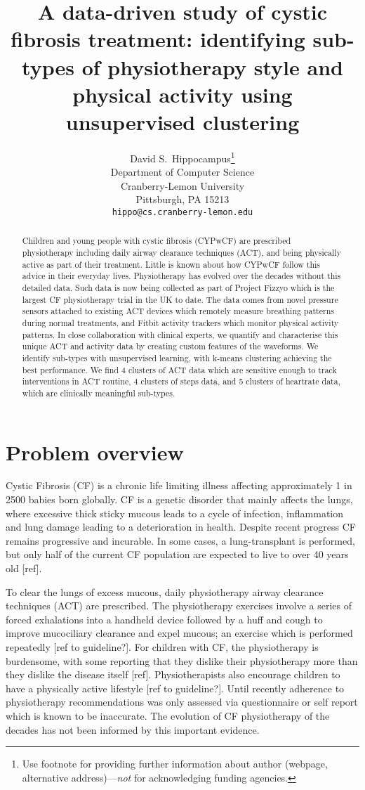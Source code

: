 \documentclass{article}
\title{A data-driven study of cystic fibrosis treatment: identifying sub-types of physiotherapy style and physical activity using unsupervised clustering}
\author{%
  David S.~Hippocampus\thanks{Use footnote for providing further information
    about author (webpage, alternative address)---\emph{not} for acknowledging
    funding agencies.} \\
  Department of Computer Science\\
  Cranberry-Lemon University\\
  Pittsburgh, PA 15213 \\
  \texttt{hippo@cs.cranberry-lemon.edu} \\
}
\begin{document}
\maketitle

\begin{abstract}
  Children and young people with cystic fibrosis (CYPwCF) are prescribed physiotherapy including daily airway clearance techniques (ACT), and being physically active as part of their treatment. Little is known about how CYPwCF follow this advice in their everyday lives. Physiotherapy has evolved over the decades without this detailed data. Such data is now being collected as part of Project Fizzyo which is the largest CF physiotherapy trial in the UK to date. The data comes from novel pressure sensors attached to existing ACT devices which remotely measure breathing patterns during normal treatments, and Fitbit activity trackers which monitor physical activity patterns. In close collaboration with clinical experts, we quantify and characterise this unique ACT and activity data by creating custom features of the waveforms. We identify sub-types with unsupervised learning, with k-means clustering achieving the best performance. We find 4 clusters of ACT data which are sensitive enough to track interventions in ACT routine, 4 clusters of steps data, and 5 clusters of heartrate data, which are clinically meaningful sub-types.
\end{abstract}

\section{Problem overview}

Cystic Fibrosis (CF) is a chronic life limiting illness affecting approximately 1 in 2500 babies born globally. CF is a genetic disorder that mainly affects the lungs, where excessive thick sticky mucous leads to a cycle of infection, inflammation and lung damage leading to a deterioration in health. Despite recent progress CF remains progressive and incurable. In some cases, a lung-transplant is performed, but only half of the current CF population are expected to live to over 40 years old [ref].  

To clear the lungs of excess mucous, daily physiotherapy airway clearance techniques (ACT) are prescribed. The physiotherapy exercises involve a series of forced exhalations into a handheld device  followed by a huff and cough to improve mucociliary clearance and expel mucous; an exercise which is performed repeatedly [ref to guideline?]. For children with CF, the physiotherapy is burdensome, with some reporting that they dislike their physiotherapy more than they dislike the disease itself [ref]. Physiotherapists also encourage children to have a physically active lifestyle [ref to guideline?]. Until recently adherence to physiotherapy recommendations was only assessed via questionnaire or self report which is known to be inaccurate. The evolution of CF physiotherapy of the decades has not been informed by this important evidence.  
\end{document}
